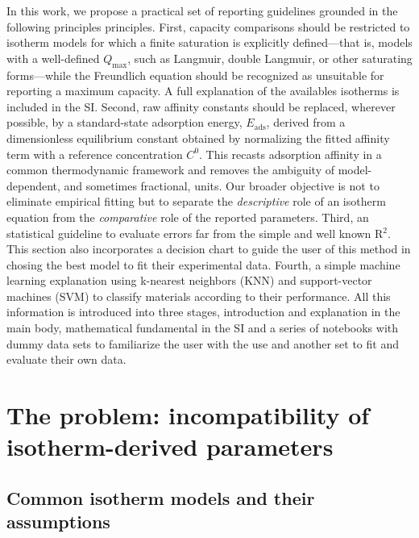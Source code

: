 \documentclass[journal=jacsat,manuscript=article]{achemso}
\begin{document}
	In this work, we propose a practical set of reporting guidelines grounded in the following principles principles. First, capacity comparisons should be restricted to isotherm models for which a finite saturation is explicitly defined---that is, models with a well-defined $Q_\mathrm{max}$, such as Langmuir, double Langmuir, or other saturating forms---while the Freundlich equation should be recognized as unsuitable for reporting a maximum capacity. A full explanation of the availables isotherms is included in the SI.
	Second, raw affinity constants should be replaced, wherever possible, by a standard-state adsorption energy, $E_\mathrm{ads}$, derived from a dimensionless equilibrium constant obtained by normalizing the fitted affinity term with a reference concentration $C^{0}$. This recasts adsorption affinity in a common thermodynamic framework and removes the ambiguity of model-dependent, and sometimes fractional, units. Our broader objective is not to eliminate empirical fitting but to separate the \emph{descriptive} role of an isotherm equation from the \emph{comparative} role of the reported parameters. 
	Third, an statistical guideline to evaluate errors far from the simple and well known R$^2$. This section also incorporates a decision chart to guide the user of this method in chosing the best model to fit their experimental data.
	Fourth, a simple machine learning explanation using k-nearest neighbors (KNN) and support-vector machines (SVM) to classify materials according to their performance.
	All this information is introduced into three stages, introduction and explanation in the main body, mathematical fundamental in the SI and a series of notebooks with dummy data sets to familiarize the user with the use and another set to fit and evaluate their own data.
	
	\section{The problem: incompatibility of isotherm-derived parameters}
	\label{sec:problem}

	\subsection{Common isotherm models and their assumptions}
	\label{sec:models}
\end{document}
